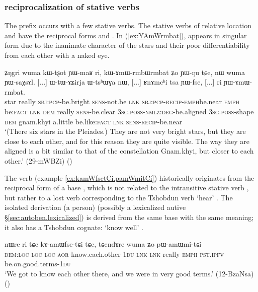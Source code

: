 \subsubsection{ reciprocalization of stative verbs} \label{sec:amW.stative}
The  prefix occurs with a few stative verbs. The stative verbs of relative location  and   have the reciprocal forms   and . In (\ref{ex:YAmWrmbat}),  appears in singular form due to the inanimate character of the stars and their poor differentiability from each other with a naked eye.

\begin{exe}
\ex \label{ex:YAmWrmbat}
\gll ʑŋgri wuma kɯ-tʂot ɲɯ-maʁ ri, kɯ-ɤmɯ-rmbɯ\redp{}rmbat ʑo ɲɯ-ŋu tɕe, nɯ wuma ɲɯ-saχsɤl. [...] ɯ-tɯ-ɤʑirja ɯ-tsʰɯɣa nɯ, [...] ʁnɤmcʰi tsa ɲɯ-fse, [...] ri ɲɯ-ɤmɯ-rmbat. \\
star really  \textsc{sbj}:\textsc{pcp}-be.bright \textsc{sens}-not.be \textsc{lnk} \textsc{sbj}:\textsc{pcp}-\textsc{recip}-\textsc{emph}\redp{}be.near \textsc{emph} be:\textsc{fact} \textsc{lnk} \textsc{dem} really \textsc{sens}-be.clear { } \textsc{3sg}.\textsc{poss}-\textsc{nmlz}:\textsc{deg}-be.aligned \textsc{3sg}.\textsc{poss}-shape \textsc{dem} {  } gnam.khyi a.little be.like:\textsc{fact} {  } \textsc{lnk} \textsc{sens}-\textsc{recip}-be.near \\
\glt `(There six stars in the Pleiades.) They are not very bright stars, but they are close to each other, and for this reason they are quite visible. The way they are aligned is a bit similar to that of the constellation Gnam.khyi, but closer to each other.' (29-mWBZi)
()
\end{exe}

The verb  (example \ref{ex:kamWfsetCi.pamWmitCi}) historically originates from the  reciprocal form of a base , which is not related to the intransitive stative verb , but rather to a lost verb corresponding to the Tshobdun verb  `hear' \citep[213]{jackson19tshobdun}. The isolated derivation  (a person) (possibly a lexicalized autive §\ref{sec:autoben.lexicalized}) is derived from the same base with the same meaning; it also has a Tshobdun cognate:  `know well' \citep[121]{jackson19tshobdun}.

\begin{exe}
\ex \label{ex:kamWfsetCi.pamWmitCi}
\gll  nɯre ri tɕe kɤ-amɯfse-tɕi tɕe, tɕendɤre wuma ʑo pɯ-amɯmi-tɕi \\
\textsc{dem}:\textsc{loc} \textsc{loc} \textsc{loc} \textsc{aor}-know.each.other-\textsc{1du} \textsc{lnk} \textsc{lnk} really \textsc{emph} \textsc{pst}.\textsc{ipfv}-be.on.good.terms-\textsc{1du} \\
\glt  `We got to know each other there, and we were in very good terms.' (12-BzaNsa) ()
\end{exe}

